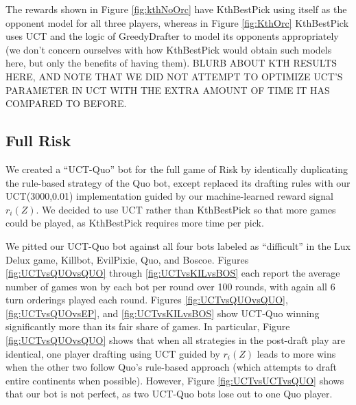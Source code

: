 \documentclass[letterpaper]{article}
\numberwithin{equation}{section}
\numberwithin{theorem}{section}
\numberwithin{lemma}{section}
\numberwithin{df}{section}
\begin{document}
The rewards shown in Figure \ref{fig:kthNoOrc} have KthBestPick using itself as the opponent model for all three players, whereas in Figure \ref{fig:KthOrc} KthBestPick uses UCT and the logic of GreedyDrafter to model its opponents appropriately (we don't concern ourselves with how KthBestPick would obtain such models here, but only the benefits of having them).  BLURB ABOUT KTH RESULTS HERE, AND NOTE THAT WE DID NOT ATTEMPT TO OPTIMIZE UCT'S PARAMETER IN UCT WITH THE EXTRA AMOUNT OF TIME IT HAS COMPARED TO BEFORE.



\subsection{Full Risk}


We created a ``UCT-Quo'' bot for the full game of Risk by identically duplicating the rule-based strategy of the Quo bot, except replaced its drafting rules with our UCT(3000,0.01) implementation guided by our machine-learned reward signal $r_i(Z)$.  We decided to use UCT rather than KthBestPick so that more games could be played, as KthBestPick requires more time per pick.  

We pitted our UCT-Quo bot against all four bots labeled as ``difficult'' in the Lux Delux game, Killbot, EvilPixie, Quo, and Boscoe.  Figures \ref{fig:UCTvsQUOvsQUO} through \ref{fig:UCTvsKILvsBOS} each report the average number of games won by each bot per round over 100 rounds, with again all 6 turn orderings played each round.  Figures \ref{fig:UCTvsQUOvsQUO}, \ref{fig:UCTvsQUOvsEP}, and \ref{fig:UCTvsKILvsBOS} show UCT-Quo winning significantly more than its fair share of games.  In particular, Figure \ref{fig:UCTvsQUOvsQUO} shows that when all strategies in the post-draft play are identical, one player drafting using UCT guided by $r_i(Z)$ leads to more wins when the other two follow Quo's rule-based approach (which attempts to draft entire continents when possible).  However, Figure \ref{fig:UCTvsUCTvsQUO} shows that our bot is not perfect, as two UCT-Quo bots lose out to one Quo player.  

\end{document}
